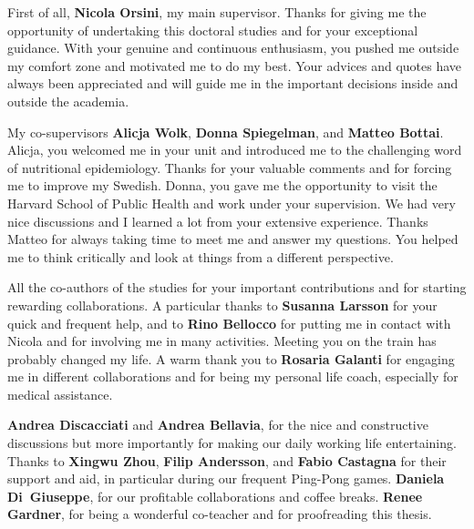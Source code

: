 \documentclass[11pt,a4paper,twoside,openany]{book}\usepackage{knitr}
\begin{document}
{First of all, \textbf{Nicola Orsini}, my main supervisor. Thanks for giving me the opportunity of undertaking this doctoral studies and for your exceptional guidance. With your genuine and continuous enthusiasm, you pushed me outside my comfort zone and motivated me to do my best. Your advices and quotes have always been  appreciated and will guide me in the important decisions inside and outside the academia. 
\medskip

My co-supervisors \textbf{Alicja Wolk}, \textbf{Donna Spiegelman}, and \textbf{Matteo Bottai}. Alicja, you welcomed me in your unit and introduced me to the challenging word of nutritional epidemiology. Thanks for your valuable comments and for forcing me to improve my Swedish. Donna, you gave me the opportunity to visit the Harvard School of Public Health and work under your supervision. We had very nice discussions and I learned a lot from your extensive experience. Thanks Matteo for always taking time to meet me and answer my questions. You helped me to think critically and look at things from a different perspective.

\medskip
All the co-authors of the studies for your important contributions and for starting rewarding collaborations. A particular thanks to \textbf{Susanna Larsson} for your quick and frequent help, and to \textbf{Rino Bellocco} for putting me in contact with Nicola and for involving me in many activities. Meeting you on the train has probably changed my life. A warm thank you to \textbf{Rosaria Galanti} for engaging me in different collaborations and for being my personal life coach, especially for medical assistance.
\medskip

\textbf{Andrea Discacciati} and \textbf{Andrea Bellavia}, for the nice and constructive discussions but more importantly for making our daily working life entertaining. Thanks to \textbf{Xingwu Zhou}, \textbf{Filip Andersson}, and \textbf{Fabio Castagna} for their support and aid, in particular during our frequent Ping-Pong games. \textbf{Daniela Di~Giuseppe}, for our profitable collaborations and coffee breaks. \textbf{Renee Gardner}, for being a wonderful co-teacher and for proofreading this thesis.
\medskip

}
\end{document}
